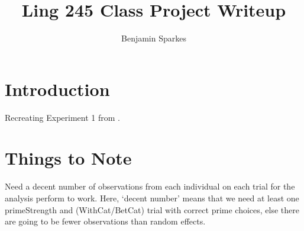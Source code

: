 \documentclass[10pt]{article}
\title{Ling 245 Class Project Writeup}
\author{Benjamin Sparkes}
\begin{document}
\maketitle

\section{Introduction}
\label{sec:introduction}

Recreating Experiment 1 from \textcite{Bott:2016aa}.

\section{Things to Note}
\label{sec:things-note}

Need a decent number of observations from each individual on each trial for the analysis \citeauthor{Bott:2016aa} perform to work.
Here, `decent number' means that we need at least one primeStrength and (WithCat/BetCat) trial with correct prime choices, else there are going to be fewer observations than random effects.
\end{document}
